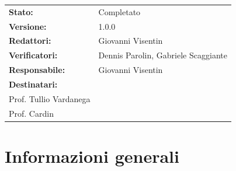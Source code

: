 \documentclass[a4paper,12pt]{article}
\begin{document}
\begin{tcolorbox}
\begin{tabularx}{\textwidth}{@{}l X@{}}
\textbf{Stato:} & Completato \\
\textbf{Versione:} & 1.0.0 \\
\textbf{Redattori:} & Giovanni Visentin \\
\textbf{Verificatori:} & Dennis Parolin, Gabriele Scaggiante \\
\textbf{Responsabile:} & Giovanni Visentin \\
\textbf{Destinatari:} & 
\begin{tabular}[t]{@{}l@{}}
Miriade \\
Prof. Tullio Vardanega \\
Prof. Cardin
\end{tabular} \\
\end{tabularx}
\end{tcolorbox}

\vspace*{\fill} %
\clearpage

\clearpage
\tableofcontents
\thispagestyle{empty} %
\clearpage

\section{Informazioni generali}
\renewcommand{\arraystretch}{1.3}
\end{document}
